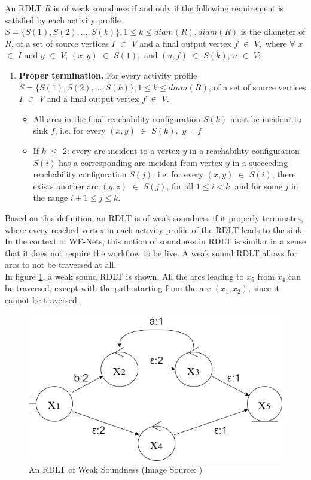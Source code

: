 \begin{defn} 
    \label{WeakRDLTDef}
    An RDLT $ R $ is of weak soundness if and only if the following requirement is satisfied by each activity profile $ S = \{S(1), S(2), ..., S(k)\}, 1 \leq k \leq diam(R), diam(R) $ is the diameter of $ R $, of a set of source vertices $ I $ $ \subset $ $ V $ and a final output vertex $ f $ $ \in $ $ V, $ where $ \forall $ $ x $ $ \in $ $ I $ and $ y $ $ \in $ $ V $, $ (x,y) $ $ \in $ $ S(1), $ and $ (u,f) $ $ \in $ $ S(k) $, $ u $ $ \in $ $ V $:
    \begin{enumerate}
        \item \textbf{Proper termination.} For every activity profile $ S = \{S(1), S(2), ..., S(k)\}, 1 \leq k \leq diam(R) $, of a set of source vertices $ I $ $ \subset $ $ V $ and a final output vertex $ f $ $ \in $ $ V $.
        \begin{itemize}
            \item All arcs in the final reachability configuration $ S(k) $ must be incident to sink $ f $, i.e. for every $ (x,y) $ $ \in $ $ S(k), $ $ y = f $
            \item If $ k $ $ \leq $ $ 2 $: every arc incident to a vertex $ y $ in a reachability configuration $ S(i) $ has a corresponding arc incident from vertex $ y $ in a succeeding reachability configuration $ S(j) $, i.e. for every $ (x,y) $ $ \in $ $ S(i) $, there exists another arc $ (y,z) $ $ \in $ $ S(j) $, for all $ 1 \leq i < k $, and for some $ j $ in the range $ i + 1 \leq j \leq k $.
        \end{itemize}
    \end{enumerate}
\end{defn}
Based on this definition, an RDLT is of weak soundness if it properly terminates, where every reached vertex in each activity profile of the RDLT leads to the sink. In the context of WF-Nets, this notion of soundness in RDLT is similar in a sense that it does not require the workflow to be live. A weak sound RDLT allows for arcs to not be traversed at all. \\
In figure \ref{RDLTWeak}, a weak sound RDLT is shown. All the arcs leading to $x_5$ from $x_4$ can be traversed, except with the path starting from the arc $(x_1, x_2)$, since it cannot be traversed.
\begin{figure}[H]
    \centering
    \includegraphics[width=12cm]{../figures/RDLT Weak.png}
    \caption{An RDLT of Weak Soundness (Image Source: \cite{Ramirez2024})}
    \label{RDLTWeak}
\end{figure}

